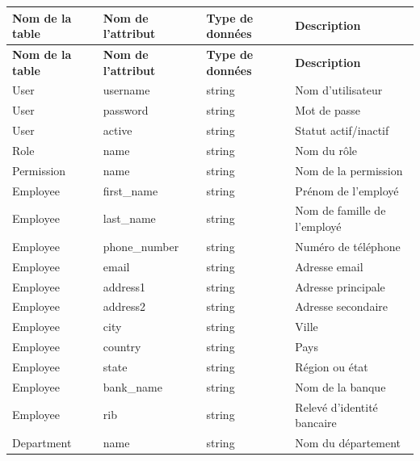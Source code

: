 \begin{longtable}{|p{3.5cm}|p{3.5cm}|p{3cm}|p{5cm}|}
    \hline
    \textbf{Nom de la table} & \textbf{Nom de l'attribut} & \textbf{Type de données} & \textbf{Description} \\
    \hline
    \endfirsthead

    \hline
    \textbf{Nom de la table} & \textbf{Nom de l'attribut} & \textbf{Type de données} & \textbf{Description} \\
    \hline
    \endhead

    \hline
    User & username & string & Nom d'utilisateur \\
    \hline
    User & password & string & Mot de passe \\
    \hline
    User & active & string & Statut actif/inactif \\
    \hline
    
    Role & name & string & Nom du rôle \\
    \hline
    
    Permission & name & string & Nom de la permission \\
    \hline

    Employee & first\_name & string & Prénom de l'employé \\
    \hline
    Employee & last\_name & string & Nom de famille de l'employé \\
    \hline
    Employee & phone\_number & string & Numéro de téléphone \\
    \hline
    Employee & email & string & Adresse email \\
    \hline
    Employee & address1 & string & Adresse principale \\
    \hline
    Employee & address2 & string & Adresse secondaire \\
    \hline
    Employee & city & string & Ville \\
    \hline
    Employee & country & string & Pays \\
    \hline
    Employee & state & string & Région ou état \\
    \hline
    Employee & bank\_name & string & Nom de la banque \\
    \hline
    Employee & rib & string & Relevé d'identité bancaire \\
    \hline

    Department & name & string & Nom du département \\
    \hline


\end{longtable}
